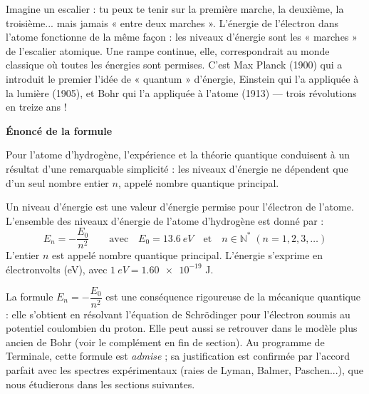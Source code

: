 \documentclass[11pt]{article}
\newcommand{\cle}[1]{{\popxbold\color{popdark}#1}}
\newcounter{popsec}
\newcounter{popsub}
\newcommand{\courssub}[1]{%
  \stepcounter{popsub}%
  \par\vspace{9pt}\noindent{\popxbold\fontsize{11.5}{13}\selectfont\color{popink}{\color{poporange}\thepopsec.\thepopsub}\hspace{6pt}#1}\par\nopagebreak\vspace{4pt}
}
\begin{document}
\begin{savaistu}
Imagine un escalier : tu peux te tenir sur la première marche, la deuxième, la troisième... mais jamais « entre deux marches ». L'énergie de l'électron dans l'atome fonctionne de la même façon : les niveaux d'énergie sont les « marches » de l'escalier atomique. Une rampe continue, elle, correspondrait au monde classique où toutes les énergies sont permises. C'est Max Planck (1900) qui a introduit le premier l'idée de « quantum » d'énergie, Einstein qui l'a appliquée à la lumière (1905), et Bohr qui l'a appliquée à l'atome (1913) — trois révolutions en treize ans !
\end{savaistu}

\courssub{La formule des niveaux d'énergie}

\textbf{Énoncé de la formule}\par

Pour l'atome d'hydrogène, l'expérience et la théorie quantique conduisent à un résultat d'une remarquable simplicité : les niveaux d'énergie ne dépendent que d'un seul nombre entier $n$, appelé \cle{nombre quantique principal}.

\begin{definition}
Un \cle{niveau d'énergie} est une valeur d'énergie permise pour l'électron de l'atome. L'ensemble des niveaux d'énergie de l'atome d'hydrogène est donné par :
\[
\boxed{E_n = -\dfrac{E_0}{n^2}} \qquad \text{avec} \quad E_0 = \SI{13,6}{eV} \quad \text{et} \quad n \in \mathbb{N}^* \; (n = 1, 2, 3, \ldots)
\]
L'entier $n$ est appelé \cle{nombre quantique principal}. L'énergie s'exprime en électronvolts (eV), avec $\SI{1}{eV} = \num{1,60e-19}$ J.
\end{definition}

\begin{propriete}
La formule $E_n = -\dfrac{E_0}{n^2}$ est une conséquence rigoureuse de la \cle{mécanique quantique} : elle s'obtient en résolvant l'équation de Schrödinger pour l'électron soumis au potentiel coulombien du proton. Elle peut aussi se retrouver dans le modèle plus ancien de Bohr (voir le complément en fin de section). Au programme de Terminale, cette formule est \emph{admise} ; sa justification est confirmée par l'accord parfait avec les spectres expérimentaux (raies de Lyman, Balmer, Paschen...), que nous étudierons dans les sections suivantes.
\end{propriete}
\end{document}
